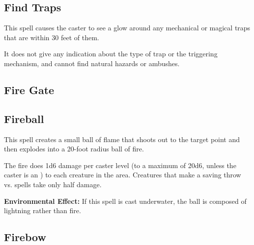 \begin{multicols*}{2}
\subsection{Find Traps}\label{spell:Find Traps}

This spell causes the caster to see a glow around any mechanical or magical traps that are within 30 feet of them.

It does not give any indication about the type of trap or the triggering mechanism, and cannot find natural hazards or ambushes.

\subsection{Fire Gate}\label{spell:Fire Gate}



\subsection{Fireball}\label{spell:Fireball}

This spell creates a small ball of flame that shoots out to the target point and then explodes into a 20-foot radius ball of fire.

The fire does 1d6 damage per caster level (to a maximum of 20d6, unless the caster is an ) to each creature in the area. Creatures that make a saving throw vs. spells take only half damage.

\textbf{Environmental Effect:} If this spell is cast underwater, the ball is composed of lightning rather than fire.


\subsection{Firebow}\label{spell:Firebow}
\end{multicols*}
